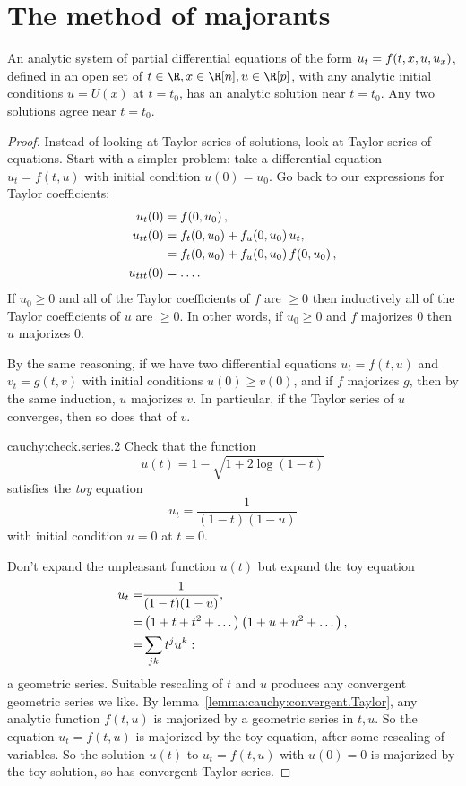 \section{The method of majorants}
\begin{theorem}%
\label{theorem:Cauchy.Kovalevksaya}%
%
%
An analytic system of partial differential equations of the form \(u_t=f\!\left(t,x,u,u_x\right)\), defined in an open set of \(t \in \R, x \in \R[n], u \in \R[p]\), with any analytic initial conditions \(u=U(x)\) at \(t=t_0\), has an analytic solution near \(t=t_0\).
Any two solutions agree near \(t=t_0\).
\end{theorem}
\begin{proof}
Instead of looking at Taylor series of solutions, look at Taylor series of equations.
Start with a simpler problem: take a differential equation \(u_t=f(t,u)\) with initial condition \(u(0)=u_0\).
Go back to our expressions for Taylor coefficients:
\begin{align*}
 u_t(0) &= f\!\left(0,u_0\right), \\
 u_{tt}(0) &=f_t\!\left(0,u_0\right)+f_u\!\left(0,u_0\right)u_t, \\
 &=f_t\!\left(0,u_0\right)+f_u\!\left(0,u_0\right)f\!\left(0,u_0\right), \\
 u_{ttt}(0)&= \dots. 
\end{align*}
If \(u_0 \ge 0\) and all of the Taylor coefficients of \(f\) are \(\ge 0\) then inductively all of the Taylor coefficients of \(u\) are \(\ge 0\).
In other words, if \(u_0 \ge 0\) and \(f\) majorizes \(0\) then \(u\) majorizes \(0\).

By the same reasoning, if we have two differential equations \(u_t=f(t,u)\) and \(v_t=g(t,v)\) with initial conditions \(u(0) \ge v(0)\), and if \(f\) majorizes \(g\), then by the same induction, \(u\) majorizes \(v\).
In particular, if the Taylor series of \(u\) converges, then so does that of \(v\).
\begin{problem}{cauchy:check.series.2}
 Check that the function
 \[
  u(t)=1-\sqrt{1+2 \log(1-t)}
 \]
 satisfies the \emph{toy} equation
 \[
  u_t = \frac{1}{(1-t)(1-u)}
 \]
 with initial condition \(u=0\) at \(t=0\).
\end{problem}

Don't expand the unpleasant function \(u(t)\) but expand the toy equation
\begin{align*}
  u_t=&\frac{1}{(1-t)(1-u)},\\ 
  =&\left(1+t+t^2+\dots\right)\left(1+u+u^2+\dots\right), \\
  =&\sum_{jk} t^ju^k:
\end{align*}
a geometric series.
Suitable rescaling of \(t\) and \(u\) produces any convergent geometric series we like.
By lemma~\vref{lemma:cauchy:convergent.Taylor}, any analytic function \(f(t,u)\) is majorized by a geometric series in \(t,u\).
So the equation \(u_t=f(t,u)\) is majorized by the toy equation, after some rescaling of variables.
So the solution \(u(t)\) to \(u_t=f(t,u)\) with \(u(0)=0\) is majorized by the toy solution, so has convergent Taylor series.


\end{proof}
